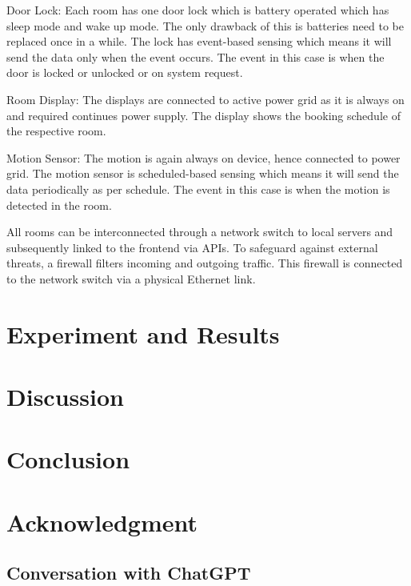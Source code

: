 \documentclass[conference,onecolumn]{IEEEtran}
\begin{document}
	Door Lock: Each room has one door lock which is battery operated which has sleep mode and wake up mode. The only drawback of this is batteries need to be replaced once in a while. The lock has event-based sensing which means it will send the data only when the event occurs. The event in this case is when the door is locked or unlocked or on system request.

	Room Display: The displays are connected to active power grid as it is always on and required continues power supply. The display shows the booking schedule of the respective room.

	Motion Sensor: The motion is again always on device, hence connected to power grid. The motion sensor is scheduled-based sensing which means it will send the data periodically as per schedule. The event in this case is when the motion is detected in the room.

	All rooms can be interconnected through a network switch to local servers and subsequently linked to the frontend via APIs. To safeguard against external threats, a firewall filters incoming and outgoing traffic. This firewall is connected to the network switch via a physical Ethernet link.


\section{Experiment and Results}
\section{Discussion}


\section{Conclusion}

\section*{Acknowledgment}

\newpage
\appendix

\subsection{Conversation with ChatGPT} \label{appdx:chatgpt}
 
\end{document}
